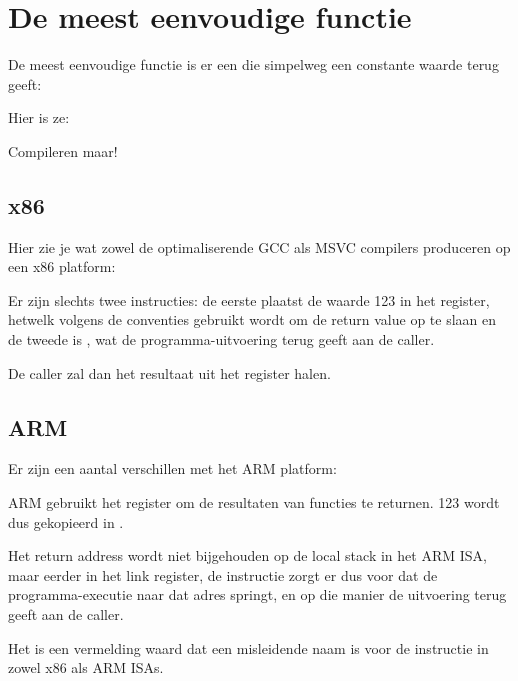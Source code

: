 \chapter{De meest eenvoudige functie}

De meest eenvoudige functie is er een die simpelweg een constante waarde terug geeft:

Hier is ze:



Compileren maar!

\section{x86}

Hier zie je wat zowel de optimaliserende GCC als MSVC compilers produceren op een x86 platform:



Er zijn slechts twee instructies: de eerste plaatst de waarde 123 in het \EAX register, hetwelk volgens de conventies gebruikt wordt om de return value op te slaan en de tweede is \RET, wat de programma-uitvoering terug geeft aan de \gls{caller}.

De caller zal dan het resultaat uit het \EAX register halen.

\ifdefined\IncludeARM
\section{ARM}

Er zijn een aantal verschillen met het ARM platform:



ARM gebruikt het register  om de resultaten van functies te returnen. 123 wordt dus gekopieerd in .

Het return address wordt niet bijgehouden op de local stack in het ARM \ac{ISA}, maar eerder in het link register, de  instructie zorgt er dus voor dat de programma-executie naar dat adres springt, en op die manier de uitvoering terug geeft aan de \gls{caller}.
\fi %

Het is een vermelding waard dat \MOV een misleidende naam is voor de instructie in zowel x86 als ARM \ac{ISA}s.

